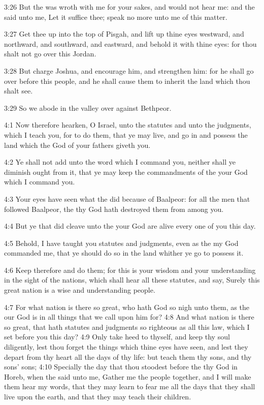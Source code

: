 3:26 But the \LORD was wroth with me for your sakes, and would not hear me: and the \LORD said unto me, Let it suffice thee; speak no more unto me of this matter.

3:27 Get thee up into the top of Pisgah, and lift up thine eyes westward, and northward, and southward, and eastward, and behold it with thine eyes: for thou shalt not go over this Jordan.

3:28 But charge Joshua, and encourage him, and strengthen him: for he shall go over before this people, and he shall cause them to inherit the land which thou shalt see.

3:29 So we abode in the valley over against Bethpeor.

4:1 Now therefore hearken, O Israel, unto the statutes and unto the judgments, which I teach you, for to do them, that ye may live, and go in and possess the land which the \LORD God of your fathers giveth you.

4:2 Ye shall not add unto the word which I command you, neither shall ye diminish ought from it, that ye may keep the commandments of the \LORD your God which I command you.

4:3 Your eyes have seen what the \LORD did because of Baalpeor: for all the men that followed Baalpeor, the \LORD thy God hath destroyed them from among you.

4:4 But ye that did cleave unto the \LORD your God are alive every one of you this day.

4:5 Behold, I have taught you statutes and judgments, even as the \LORD my God commanded me, that ye should do so in the land whither ye go to possess it.

4:6 Keep therefore and do them; for this is your wisdom and your understanding in the sight of the nations, which shall hear all these statutes, and say, Surely this great nation is a wise and understanding people.

4:7 For what nation is there so great, who hath God so nigh unto them, as the \LORD our God is in all things that we call upon him for?  4:8 And what nation is there so great, that hath statutes and judgments so righteous as all this law, which I set before you this day?  4:9 Only take heed to thyself, and keep thy soul diligently, lest thou forget the things which thine eyes have seen, and lest they depart from thy heart all the days of thy life: but teach them thy sons, and thy sons' sons; 4:10 Specially the day that thou stoodest before the \LORD thy God in Horeb, when the \LORD said unto me, Gather me the people together, and I will make them hear my words, that they may learn to fear me all the days that they shall live upon the earth, and that they may teach their children.

